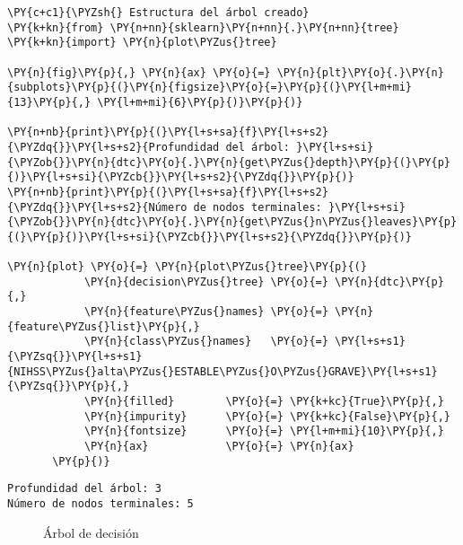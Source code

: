     \begin{tcolorbox}[breakable, size=fbox, boxrule=1pt, pad at break*=1mm,colback=cellbackground, colframe=cellborder]
\begin{Verbatim}[commandchars=\\\{\}]
\PY{c+c1}{\PYZsh{} Estructura del árbol creado}
\PY{k+kn}{from} \PY{n+nn}{sklearn}\PY{n+nn}{.}\PY{n+nn}{tree} \PY{k+kn}{import} \PY{n}{plot\PYZus{}tree}

\PY{n}{fig}\PY{p}{,} \PY{n}{ax} \PY{o}{=} \PY{n}{plt}\PY{o}{.}\PY{n}{subplots}\PY{p}{(}\PY{n}{figsize}\PY{o}{=}\PY{p}{(}\PY{l+m+mi}{13}\PY{p}{,} \PY{l+m+mi}{6}\PY{p}{)}\PY{p}{)}

\PY{n+nb}{print}\PY{p}{(}\PY{l+s+sa}{f}\PY{l+s+s2}{\PYZdq{}}\PY{l+s+s2}{Profundidad del árbol: }\PY{l+s+si}{\PYZob{}}\PY{n}{dtc}\PY{o}{.}\PY{n}{get\PYZus{}depth}\PY{p}{(}\PY{p}{)}\PY{l+s+si}{\PYZcb{}}\PY{l+s+s2}{\PYZdq{}}\PY{p}{)}
\PY{n+nb}{print}\PY{p}{(}\PY{l+s+sa}{f}\PY{l+s+s2}{\PYZdq{}}\PY{l+s+s2}{Número de nodos terminales: }\PY{l+s+si}{\PYZob{}}\PY{n}{dtc}\PY{o}{.}\PY{n}{get\PYZus{}n\PYZus{}leaves}\PY{p}{(}\PY{p}{)}\PY{l+s+si}{\PYZcb{}}\PY{l+s+s2}{\PYZdq{}}\PY{p}{)}

\PY{n}{plot} \PY{o}{=} \PY{n}{plot\PYZus{}tree}\PY{p}{(}
            \PY{n}{decision\PYZus{}tree} \PY{o}{=} \PY{n}{dtc}\PY{p}{,}
            \PY{n}{feature\PYZus{}names} \PY{o}{=} \PY{n}{feature\PYZus{}list}\PY{p}{,}
            \PY{n}{class\PYZus{}names}   \PY{o}{=} \PY{l+s+s1}{\PYZsq{}}\PY{l+s+s1}{NIHSS\PYZus{}alta\PYZus{}ESTABLE\PYZus{}O\PYZus{}GRAVE}\PY{l+s+s1}{\PYZsq{}}\PY{p}{,}
            \PY{n}{filled}        \PY{o}{=} \PY{k+kc}{True}\PY{p}{,}
            \PY{n}{impurity}      \PY{o}{=} \PY{k+kc}{False}\PY{p}{,}
            \PY{n}{fontsize}      \PY{o}{=} \PY{l+m+mi}{10}\PY{p}{,}
            \PY{n}{ax}            \PY{o}{=} \PY{n}{ax}
       \PY{p}{)}
\end{Verbatim}
\end{tcolorbox}

    \begin{Verbatim}[commandchars=\\\{\}]
Profundidad del árbol: 3
Número de nodos terminales: 5
    \end{Verbatim}

\begin{center}
    	\begin{figure}[h!]
	\centering
	\caption{Árbol de decisión}
	\label{fig:ad}
	\end{figure}
\end{center}
    
